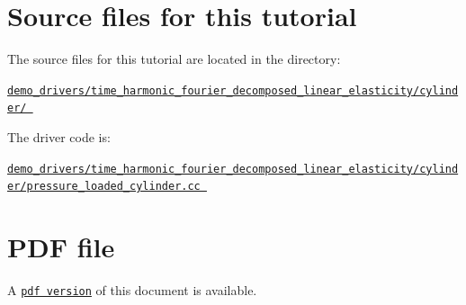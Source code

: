  

\hypertarget{index_sources}{}\section{Source files for this tutorial}\label{index_sources}

\begin{DoxyItemize}
\item The source files for this tutorial are located in the directory\+: \begin{center} \href{../../../../demo_drivers/time_harmonic_fourier_decomposed_linear_elasticity/cylinder/}{\tt demo\+\_\+drivers/time\+\_\+harmonic\+\_\+fourier\+\_\+decomposed\+\_\+linear\+\_\+elasticity/cylinder/ } \end{center} 
\item The driver code is\+: \begin{center} \href{../../../../demo_drivers/time_harmonic_fourier_decomposed_linear_elasticity/cylinder/pressure_loaded_cylinder.cc}{\tt demo\+\_\+drivers/time\+\_\+harmonic\+\_\+fourier\+\_\+decomposed\+\_\+linear\+\_\+elasticity/cylinder/pressure\+\_\+loaded\+\_\+cylinder.\+cc } \end{center} 
\end{DoxyItemize}



 

 \hypertarget{index_pdf}{}\section{P\+D\+F file}\label{index_pdf}
A \href{../latex/refman.pdf}{\tt pdf version} of this document is available. 
